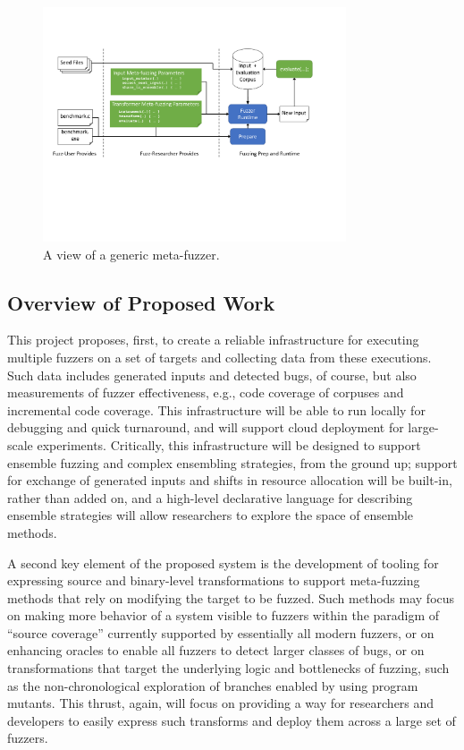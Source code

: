 \begin{figure}
\centering
\includegraphics[width=0.8\textwidth,trim={0.3in 3.0in 1.2in 1.4in},clip]{figures/fuzzer-arch.pdf}
\caption{A view of a generic meta-fuzzer.}
\label{fig:meta}
\end{figure}



\subsection{Overview of Proposed Work}

This project proposes, first, to create a reliable infrastructure for executing 
multiple fuzzers on a set of targets and collecting data from these executions. 
 Such data includes generated inputs and detected bugs, of course, but also 
measurements of fuzzer effectiveness, e.g., code coverage of corpuses and 
incremental code coverage.  This infrastructure will be able to run locally for 
debugging and quick turnaround, and will support cloud deployment for 
large-scale experiments. Critically, this infrastructure will be designed to 
support ensemble fuzzing and complex ensembling strategies, from the ground up; 
support for exchange of generated inputs and shifts in resource allocation will 
be built-in, rather than added on, and a high-level declarative language for 
describing ensemble strategies will allow researchers to explore the space of 
ensemble methods.

A second key element of the proposed system is the development of tooling for 
expressing source and binary-level transformations to support meta-fuzzing 
methods that rely on modifying the target to be fuzzed.  Such methods may focus 
on making more behavior of a system visible to fuzzers within the paradigm of 
``source coverage'' currently supported by essentially all modern fuzzers, or 
on enhancing oracles to enable all fuzzers to detect larger classes of bugs, or 
on transformations that target the underlying logic and bottlenecks of fuzzing, 
such as the non-chronological exploration of branches enabled by using program 
mutants.  This thrust, again, will focus on providing a way for researchers and 
developers to easily express such transforms and deploy them across a large set 
of fuzzers.

